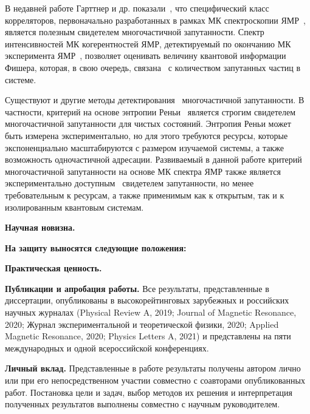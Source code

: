 В недавней работе Гарттнер и др. показали~\cite{Garttner2018},
что специфический класс корреляторов,
первоначально разработанных в рамках МК спектроскопии ЯМР~\cite{Baum1985},
является полезным свидетелем многочастичной запутанности.
Спектр интенсивностей МК когерентностей ЯМР,
детектируемый по окончанию МК эксперимента ЯМР~\cite{Baum1985},
позволяет оценивать величину квантовой информации Фишера,
которая, в свою очередь, связана~\cite{Toth2014} с количеством запутанных частиц в системе.

Существуют и другие методы детектирования~\cite{Guhne2009} многочастичной запутанности.
В частности, критерий на основе энтропии Реньи~\cite{Hosur2016, Fan2017}
является строгим свидетелем многочастичной запутанности для чистых состояний.
Энтропия Реньи может быть измерена экспериментально,
но для этого требуются ресурсы,
которые экспоненциально масштабируются с размером изучаемой системы,
а также возможность одночастичной адресации.
Развиваемый в данной работе критерий многочастичной запутанности на основе МК спектра ЯМР
также является экспериментально доступным~\cite{Baum1985} свидетелем запутанности,
но менее требовательным к ресурсам,
а также применимым как к открытым,
так и к изолированным квантовым системам.





\textbf{Научная новизна.}


\textbf{На защиту выносятся следующие положения:}



\textbf{Практическая ценность.}


\textbf{Публикации и апробация работы.}
Все результаты, представленные в диссертации,
опубликованы в высокорейтинговых зарубежных и российских научных журналах (Physical Review A, 2019;  Journal of Magnetic Resonance, 2020; Журнал экспериментальной и теоретической физики, 2020; Applied Magnetic Resonance, 2020;  Physics Letters A, 2021) и представлены на пяти международных и одной всероссийской конференциях.

\textbf{Личный вклад.}
Представленные в работе результаты получены автором лично или при его непосредственном участии совместно с соавторами опубликованных работ. Постановка цели и задач, выбор методов их решения и интерпретация полученных результатов выполнены совместно с научным руководителем.


